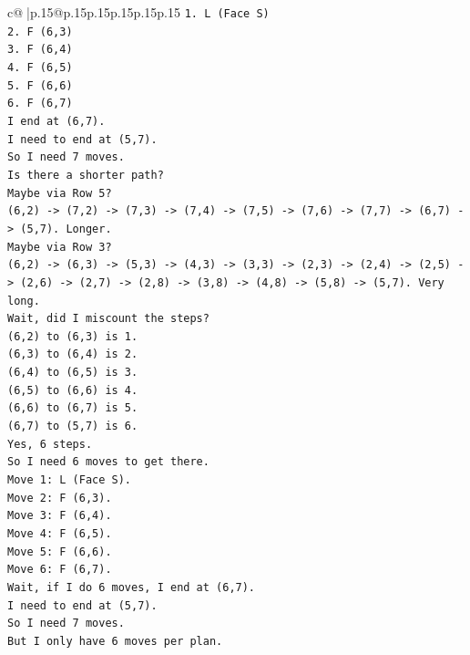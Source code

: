 \documentclass{article}
\begin{document}
{\begin{supertabular}{c@{$\;$}|p{.15\linewidth}@{}p{.15\linewidth}p{.15\linewidth}p{.15\linewidth}p{.15\linewidth}p{.15\linewidth}}
{{{\texttt{1. L (Face S)} \\
\texttt{2. F (6,3)} \\
\texttt{3. F (6,4)} \\
\texttt{4. F (6,5)} \\
\texttt{5. F (6,6)} \\
\texttt{6. F (6,7)} \\
\texttt{I end at (6,7).} \\
\texttt{I need to end at (5,7).} \\
\texttt{So I need 7 moves.} \\
\texttt{Is there a shorter path?} \\
\texttt{Maybe via Row 5?} \\
\texttt{(6,2) {-}> (7,2) {-}> (7,3) {-}> (7,4) {-}> (7,5) {-}> (7,6) {-}> (7,7) {-}> (6,7) {-}> (5,7). Longer.} \\
\texttt{Maybe via Row 3?} \\
\texttt{(6,2) {-}> (6,3) {-}> (5,3) {-}> (4,3) {-}> (3,3) {-}> (2,3) {-}> (2,4) {-}> (2,5) {-}> (2,6) {-}> (2,7) {-}> (2,8) {-}> (3,8) {-}> (4,8) {-}> (5,8) {-}> (5,7). Very long.} \\
\texttt{Wait, did I miscount the steps?} \\
\texttt{(6,2) to (6,3) is 1.} \\
\texttt{(6,3) to (6,4) is 2.} \\
\texttt{(6,4) to (6,5) is 3.} \\
\texttt{(6,5) to (6,6) is 4.} \\
\texttt{(6,6) to (6,7) is 5.} \\
\texttt{(6,7) to (5,7) is 6.} \\
\texttt{Yes, 6 steps.} \\
\texttt{So I need 6 moves to get there.} \\
\texttt{Move 1: L (Face S).} \\
\texttt{Move 2: F (6,3).} \\
\texttt{Move 3: F (6,4).} \\
\texttt{Move 4: F (6,5).} \\
\texttt{Move 5: F (6,6).} \\
\texttt{Move 6: F (6,7).} \\
\texttt{Wait, if I do 6 moves, I end at (6,7).} \\
\texttt{I need to end at (5,7).} \\
\texttt{So I need 7 moves.} \\
\texttt{But I only have 6 moves per plan.} \\
}}}
\end{supertabular}}
\end{document}
